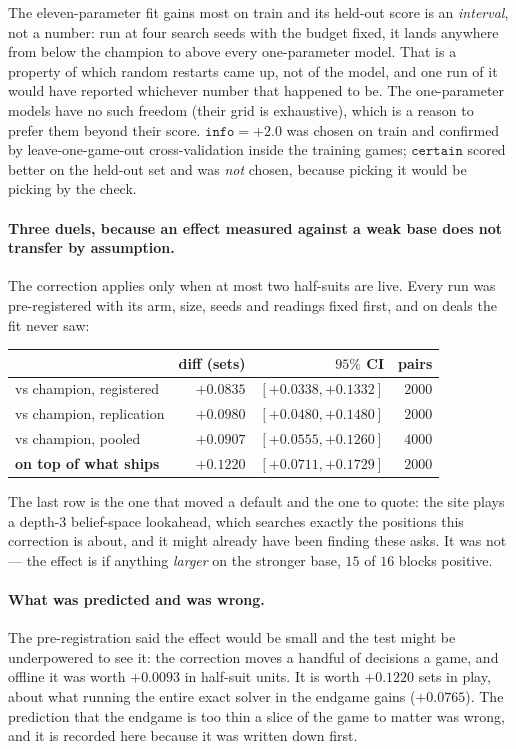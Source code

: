 \documentclass[11pt,letterpaper]{article}
\begin{document}
The eleven-parameter fit gains most on train and its held-out score is an
\emph{interval}, not a number: run at four search seeds with the budget fixed,
it lands anywhere from below the champion to above every one-parameter model.
That is a property of which random restarts came up, not of the model, and one
run of it would have reported whichever number that happened to be. The
one-parameter models have no such freedom (their grid is exhaustive), which
is a reason to prefer them beyond their score. $\mathtt{info} = +2.0$ was
chosen on train and confirmed by leave-one-game-out cross-validation inside the
training games; $\mathtt{certain}$ scored better on the held-out set and was
\emph{not} chosen, because picking it would be picking by the check.

\paragraph{Three duels, because an effect measured against a weak base does not
transfer by assumption.} The correction applies only when at most two
half-suits are live. Every run was pre-registered with its arm, size, seeds and
readings fixed first, and on deals the fit never saw:

\begin{center}
\begin{tabular}{lrrr}
\toprule
& diff (sets) & $95\%$ CI & pairs \\
\midrule
vs champion, registered   & $+0.0835$ & $[+0.0338, +0.1332]$ & $2000$ \\
vs champion, replication  & $+0.0980$ & $[+0.0480, +0.1480]$ & $2000$ \\
vs champion, pooled       & $+0.0907$ & $[+0.0555, +0.1260]$ & $4000$ \\
\textbf{on top of what ships} & $\mathbf{+0.1220}$ &
  $\mathbf{[+0.0711, +0.1729]}$ & $2000$ \\
\bottomrule
\end{tabular}
\end{center}

The last row is the one that moved a default and the one to quote: the site
plays a depth-3 belief-space lookahead, which searches exactly the positions
this correction is about, and it might already have been finding these asks.
It was not --- the effect is if anything \emph{larger} on the stronger base,
$15$ of $16$ blocks positive.

\paragraph{What was predicted and was wrong.} The pre-registration said the
effect would be small and the test might be underpowered to see it: the
correction moves a handful of decisions a game, and offline it was worth
$+0.0093$ in half-suit units. It is worth $+0.1220$ sets in play, about what
running the entire exact solver in the endgame gains ($+0.0765$). The
prediction that the endgame is too thin a slice of the game to matter was
wrong, and it is recorded here because it was written down first.
\end{document}
